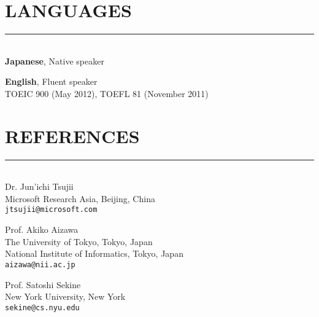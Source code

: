 \documentclass[12pt]{res}
\newcommand{\sectionline}[1][0.5pt]{\rule{\resumewidth}{#1}\\}
\begin{document}
\begin{resume}
\section{\uppercase{Languages}}
\sectionline
\textbf{Japanese}, Native speaker

\textbf{English}, Fluent speaker\\
TOEIC 900 (May 2012), TOEFL 81 (November 2011) \\

\section{\uppercase{References}}
\sectionline
Dr. Jun'ichi Tsujii \\
Microsoft Research Asia, Beijing, China\\
\texttt{jtsujii@microsoft.com}

Prof. Akiko Aizawa \\
The University of Tokyo, Tokyo, Japan\\
National Institute of Informatics, Tokyo, Japan\\
\texttt{aizawa@nii.ac.jp}

Prof. Satoshi Sekine \\
New York University, New York\\
\texttt{sekine@cs.nyu.edu}

\end{resume}
\end{document}
